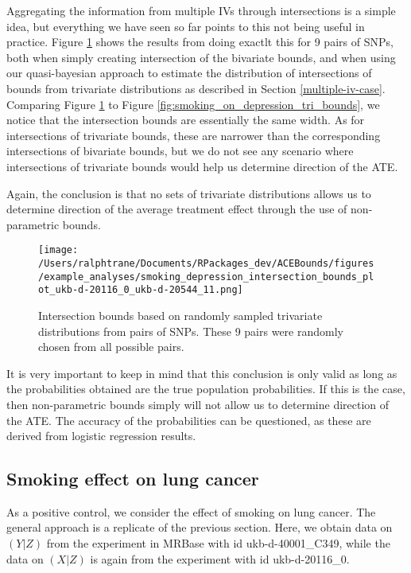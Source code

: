 \documentclass[
]{article}
\theoremstyle{plain}
\begin{document}
Aggregating the information from multiple IVs through intersections is a simple idea, but everything we have seen so far points to this not being useful in practice. Figure \ref{fig:smoking_on_depression_intersections} shows the results from doing exactlt this for 9 pairs of SNPs, both when simply creating intersection of the bivariate bounds, and when using our quasi-bayesian approach to estimate the distribution of intersections of bounds from trivariate distributions as described in Section \ref{multiple-iv-case}. Comparing Figure \ref{fig:smoking_on_depression_intersections} to Figure \ref{fig:smoking_on_depression_tri_bounds}, we notice that the intersection bounds are essentially the same width. As for intersections of trivariate bounds, these are narrower than the corresponding intersections of bivariate bounds, but we do not see any scenario where intersections of trivariate bounds would help us determine direction of the ATE.

Again, the conclusion is that no sets of trivariate distributions allows us to determine direction of the average treatment effect through the use of non-parametric bounds.

\begin{figure}[H]
  \centering
  \texttt{[image: /Users/ralphtrane/Documents/RPackages\_dev/ACEBounds/figures/example\_analyses/smoking\_depression\_intersection\_bounds\_plot\_ukb-d-20116\_0\_ukb-d-20544\_11.png]}
  \caption{Intersection bounds based on randomly sampled trivariate distributions from pairs of SNPs. These 9 pairs were randomly chosen from all possible pairs.}
  \label{fig:smoking_on_depression_intersections}
\end{figure}

It is very important to keep in mind that this conclusion is only valid as long as the probabilities obtained are the true population probabilities. If this is the case, then non-parametric bounds simply will not allow us to determine direction of the ATE. The accuracy of the probabilities can be questioned, as these are derived from logistic regression results.

\hypertarget{smoking-effect-on-lung-cancer}{%
\subsection{Smoking effect on lung cancer}\label{smoking-effect-on-lung-cancer}}

As a positive control, we consider the effect of smoking on lung cancer. The general approach is a replicate of the previous section. Here, we obtain data on \((Y|Z)\) from the experiment in MRBase with id ukb-d-40001\_C349, while the data on \((X|Z)\) is again from the experiment with id ukb-d-20116\_0.
\end{document}
